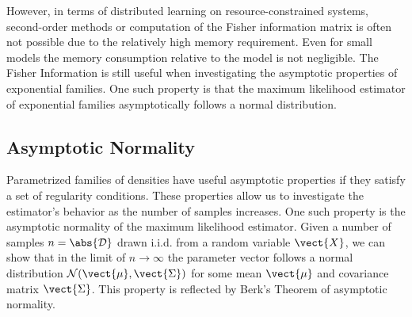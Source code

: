     However, in terms of distributed learning on resource-constrained systems, second-order methods or computation of the Fisher information matrix is often not possible due to the relatively high memory requirement.
    Even for small models the memory consumption relative to the model is not negligible.
    The Fisher Information is still useful when investigating the asymptotic properties of exponential families. 
    One such property is that the maximum likelihood estimator of exponential families asymptotically follows a normal distribution.

    \subsection{Asymptotic Normality}
        \label{ssec:asymp}
        Parametrized families of densities have useful asymptotic properties if they satisfy a set of regularity conditions.
        These properties allow us to investigate the estimator's behavior as the number of samples increases. 
        One such property is the asymptotic normality of the maximum likelihood estimator.
        Given a number of samples $n = \abs{\mathcal{D}}$ drawn i.i.d. from a random variable $\vect{X}$, we can show that in the limit of $n \rightarrow \infty$ the parameter vector follows a normal distribution $\mathcal{N}(\vect{\mu}, \vect{\Sigma})$ for some mean $\vect{\mu}$ and covariance matrix $\vect{\Sigma}$. 
        This property is reflected by Berk's Theorem of asymptotic normality.


